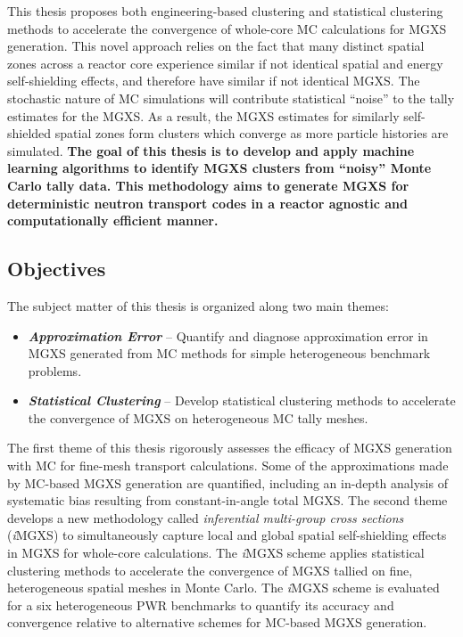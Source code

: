 \documentclass[12pt,twoside]{mitthesis-exec}
\begin{document}
This thesis proposes both engineering-based clustering and statistical clustering methods to accelerate the convergence of whole-core MC calculations for MGXS generation. This novel approach relies on the fact that many distinct spatial zones across a reactor core experience similar if not identical spatial and energy self-shielding effects, and therefore have similar if not identical MGXS. The stochastic nature of MC simulations will contribute statistical ``noise'' to the tally estimates for the MGXS. As a result, the MGXS estimates for similarly self-shielded spatial zones form clusters which converge as more particle histories are simulated. \textbf{The goal of this thesis is to develop and apply machine learning algorithms to identify MGXS clusters from ``noisy'' Monte Carlo tally data. This methodology aims to generate MGXS for deterministic neutron transport codes in a reactor agnostic and computationally efficient manner.}

\subsection*{Objectives}

The subject matter of this thesis is organized along two main themes:

\begin{itemize}
\item \textbf{\textit{Approximation Error}} -- Quantify and diagnose approximation error in MGXS generated from MC methods for simple heterogeneous benchmark problems.
\item \textbf{\textit{Statistical Clustering}} -- Develop statistical clustering methods to accelerate the convergence of MGXS on heterogeneous MC tally meshes.
\end{itemize}

The first theme of this thesis rigorously assesses the efficacy of MGXS generation with MC for fine-mesh transport calculations. Some of the approximations made by MC-based MGXS generation are quantified, including an in-depth analysis of systematic bias resulting from constant-in-angle total MGXS. The second theme develops a new methodology called \textit{inferential multi-group cross sections} (\textit{i}MGXS) to simultaneously capture local and global spatial self-shielding effects in MGXS for whole-core calculations. The \textit{i}MGXS scheme applies statistical clustering methods to accelerate the convergence of MGXS tallied on fine, heterogeneous spatial meshes in Monte Carlo. The \textit{i}MGXS scheme is evaluated for a six heterogeneous PWR benchmarks to quantify its accuracy and convergence relative to alternative schemes for MC-based MGXS generation.
\end{document}
